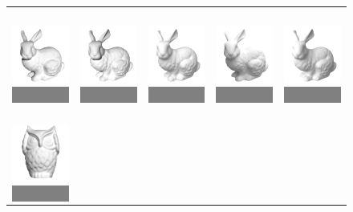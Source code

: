 \begin{figure}
\centering
\begin{tabular}{ccccc}
\colorbox{Gray}{\includegraphics[height=3cm]{recons/bunny-input-01.png}} &
\colorbox{Gray}{\includegraphics[height=3cm]{recons/bunny-input-02.png}} &
\colorbox{Gray}{\includegraphics[height=3cm]{recons/bunny-input-03.png}} &
\colorbox{Gray}{\includegraphics[height=3cm]{recons/bunny-input-04.png}} &
\colorbox{Gray}{\includegraphics[height=3cm]{recons/bunny-input-05.png} }\\
\colorbox{Gray}{\includegraphics[height=3cm]{recons/owl-input-01.png}} &

\end{tabular}
\end{figure}
